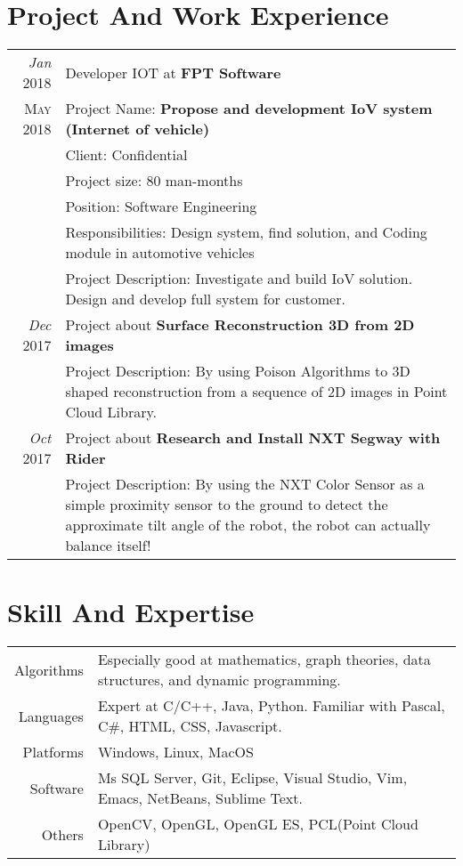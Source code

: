 \documentclass[a4paper,10pt]{article}
\begin{document}
\section{Project And Work Experience}
\begin{tabular}{r|p{14cm}}
 \emph{Jan} 2018 & Developer IOT at \textbf{FPT Software} \\\textsc{May 2018}& Project Name: \textbf{Propose and development IoV system (Internet of vehicle)} \\& Client: Confidential\\& Project size: 80 man-months\\& Position: Software Engineering\\& Responsibilities: Design system, find solution, and Coding module in automotive vehicles\\& Project Description: Investigate and build IoV solution. Design and develop full system for customer.\multicolumn{2}{c}{} \\
 
   
   \emph{Dec} 2017 & Project about \textbf{Surface Reconstruction 3D from 2D images} \\& Project Description: By using Poison Algorithms to 3D shaped reconstruction from a sequence of 2D images in Point Cloud Library.  \multicolumn{2}{c}{} \\
   
  \emph{Oct} 2017 & Project about \textbf{Research and Install NXT Segway with Rider} \\& Project Description: By using the NXT Color Sensor as a simple proximity sensor to the ground to detect the approximate tilt angle of the robot, the robot can actually balance itself!  \multicolumn{2}{c}{} \\

\end{tabular}

\section{Skill And Expertise}
\begin{tabular}{rl}
 \textsc{}Algorithms & Especially good at mathematics, graph theories, data structures, and dynamic programming.\\
\textsc{}Languages & Expert at C/C++, Java, Python. Familiar with Pascal, C\#, HTML, CSS, Javascript.\\
\textsc{}Platforms & Windows, Linux, MacOS\\
\textsc{} Software & Ms SQL Server, Git, Eclipse, Visual Studio, Vim, Emacs, NetBeans, Sublime Text.\\
\textsc{} Others & OpenCV, OpenGL, OpenGL ES, PCL(Point Cloud Library)\\
\end{tabular}
\end{document}
